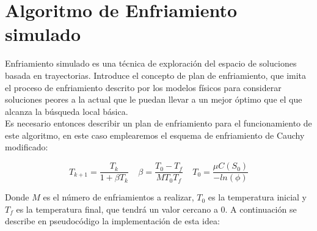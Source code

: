 \documentclass[11pt,a4paper]{article}
\begin{document}
\clearpage
		
\section{Algoritmo de Enfriamiento simulado}

	\noindent Enfriamiento simulado es una técnica de exploración del espacio de soluciones basada en trayectorias. Introduce el concepto de plan de enfriamiento, que imita el proceso de enfriamiento descrito por los modelos físicos para considerar soluciones peores a la actual que le puedan llevar a un mejor óptimo que el que alcanza la búsqueda local básica.\\
	
	\noindent Es necesario entonces describir un plan de enfriamiento para el funcionamiento de este algoritmo, en este caso emplearemos el esquema de enfriamiento de Cauchy modificado:
	
	$$ T_{k+1} = \frac{T_k}{1+\beta T_k} \;\;\;\; \beta = \frac{T_0 - T_f}{M T_0 T_f} \;\;\;\; T_0 = \frac{\mu C(S_0)}{-ln(\phi)}  $$
	
	\noindent Donde $M$ es el número de enfriamientos a realizar, $T_0$ es la temperatura inicial y $T_f$ es la temperatura final, que tendrá un valor cercano a 0. A continuación se describe en pseudocódigo la implementación de esta idea:
	
\end{document}

